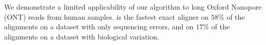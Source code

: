 We demonstrate a limited applicability of our algorithm to long Oxford
Nanopore (ONT) reads from human samples. \astarpa is the fastest exact aligner
on $58\%$ of the alignments on a dataset with only sequencing
errors, and on $17\%$ of the alignments on a dataset with biological
variation.



